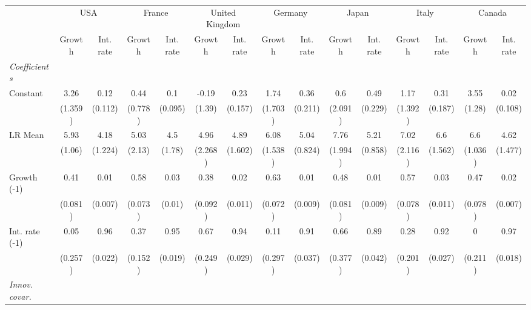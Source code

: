 \begin{table}[htbp] 
	\centering
	 \scriptsize
	\begin{tabular}{@{\extracolsep{4pt}}lcccccccccccccc@{}}		\hline\hline
		 		 & \multicolumn{2}{c}{USA} &\multicolumn{2}{c}{France} &\multicolumn{2}{c}{United Kingdom} &\multicolumn{2}{c}{Germany} &\multicolumn{2}{c}{Japan} &\multicolumn{2}{c}{Italy} &\multicolumn{2}{c}{Canada} \\ 
 		 & Growth 	 & Int. rate 	 & Growth 	 & Int. rate 	 & Growth 	 & Int. rate 	 & Growth 	 & Int. rate 	 & Growth 	 & Int. rate 	 & Growth 	 & Int. rate 	 & Growth 	 & Int. rate\\\cline{2-3}\cline{4-5}\cline{6-7}\cline{8-9}\cline{10-11}\cline{12-13}\cline{14-15}
\rule{0pt}{4ex} 
 \emph{Coefficients} 	  		 & 		 & 		 & 		 & 		 & 		 & 		 & 		 & 		 & 		 & 		 & 		 & 		 & 		 &\\ 
\quad Constant 	 & 3.26 	 & 0.12 	 & 0.44 	 & 0.1 	 & -0.19 	 & 0.23 	 & 1.74 	 & 0.36 	 & 0.6 	 & 0.49 	 & 1.17 	 & 0.31 	 & 3.55 	 & 0.02	 \\ 
 		 & (1.359) 	 & (0.112) 	 & (0.778) 	 & (0.095) 	 & (1.39) 	 & (0.157) 	 & (1.703) 	 & (0.211) 	 & (2.091) 	 & (0.229) 	 & (1.392) 	 & (0.187) 	 & (1.28) 	 & (0.108) 	 \\ 
\quad LR Mean 	 & 5.93 	 & 4.18 	 & 5.03 	 & 4.5 	 & 4.96 	 & 4.89 	 & 6.08 	 & 5.04 	 & 7.76 	 & 5.21 	 & 7.02 	 & 6.6 	 & 6.6 	 & 4.62	 \\ 
 		 & (1.06) 	 & (1.224) 	 & (2.13) 	 & (1.78) 	 & (2.268) 	 & (1.602) 	 & (1.538) 	 & (0.824) 	 & (1.994) 	 & (0.858) 	 & (2.116) 	 & (1.562) 	 & (1.036) 	 & (1.477) 	 \\ 
\quad Growth (-1) 	 &0.41 	 & 0.01 	 & 0.58 	 & 0.03 	 & 0.38 	 & 0.02 	 & 0.63 	 & 0.01 	 & 0.48 	 & 0.01 	 & 0.57 	 & 0.03 	 & 0.47 	 & 0.02	 \\ 
 		 & (0.081) 	 & (0.007) 	 & (0.073) 	 & (0.01) 	 & (0.092) 	 & (0.011) 	 & (0.072) 	 & (0.009) 	 & (0.081) 	 & (0.009) 	 & (0.078) 	 & (0.011) 	 & (0.078) 	 & (0.007) 	 \\ 
\quad Int. rate (-1) 	 &0.05 	 & 0.96 	 & 0.37 	 & 0.95 	 & 0.67 	 & 0.94 	 & 0.11 	 & 0.91 	 & 0.66 	 & 0.89 	 & 0.28 	 & 0.92 	 & 0 	 & 0.97	 \\ 
 		 & (0.257) 	 & (0.022) 	 & (0.152) 	 & (0.019) 	 & (0.249) 	 & (0.029) 	 & (0.297) 	 & (0.037) 	 & (0.377) 	 & (0.042) 	 & (0.201) 	 & (0.027) 	 & (0.211) 	 & (0.018) 	 \\ 
\rule{0pt}{4ex} \emph{Innov. covar.}  	 & 	 & 	 & 	 & 	 & 	 & 	 & 	 & 	 & 	 & 	 & 	 & 	 & 	 &\\ 

\end{tabular}
\end{table}
